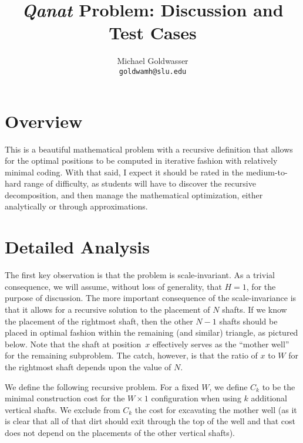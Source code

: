 \documentclass[12pt]{article}
\title{{\em Qanat} Problem: Discussion and Test Cases}
\author{Michael Goldwasser\\{\tt goldwamh@slu.edu}}
\date{}
\begin{document}
\maketitle

\section*{Overview}

This is a beautiful mathematical problem with a recursive definition
that allows for the optimal positions to be computed in iterative
fashion with relatively minimal coding. With that said, I expect
it should be rated in the medium-to-hard range of difficulty, as
students will have to discover the recursive decomposition, and then
manage the mathematical optimization, either analytically or through
approximations.

\section*{Detailed Analysis}

The first key observation is that the problem is scale-invariant.  As
a trivial consequence, we will assume, without loss of generality,
that $H = 1$, for the purpose of discussion. The more important
consequence of the scale-invariance is that it allows for a recursive
solution to the placement of $N$ shafts. If we know the placement of
the rightmost shaft, then the other $N-1$ shafts should be placed
in optimal fashion within the remaining (and similar) triangle, as
pictured below. Note that the shaft at position~$x$ effectively serves
as the ``mother well'' for the remaining subproblem.
The catch, however, is that the ratio of $x$ to $W$ for the rightmost
shaft depends upon the value of $N$.

\begin{center}
\scalebox{0.5}{}
\end{center}

We define the following recursive problem. For a fixed $W$, we define
$C_k$ to be the minimal construction cost for the $W \times 1$
configuration when using $k$ additional vertical shafts. We exclude
from $C_k$ the cost for excavating the mother well (as it is clear
that all of that dirt should exit through the top of the well and that
cost does not depend on the placements of the other vertical shafts).

\pagebreak
\begin{center}
\scalebox{0.5}{}
\end{center}
\end{document}
